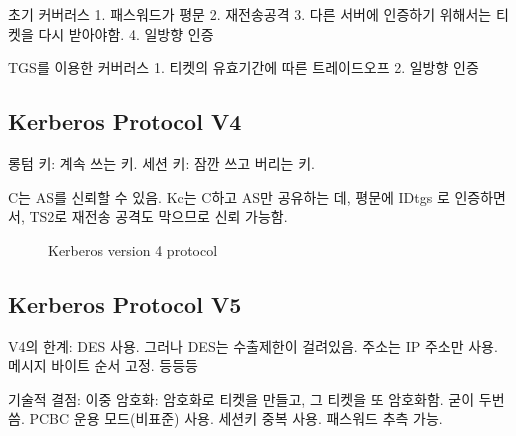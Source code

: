 초기 커버러스
1. 패스워드가 평문
2. 재전송공격
3. 다른 서버에 인증하기 위해서는 티켓을 다시 받아야함.
4. 일방향 인증

TGS를 이용한 커버러스
1. 티켓의 유효기간에 따른 트레이드오프
2. 일방향 인증

\subsection{Kerberos Protocol V4}

롱텀 키: 계속 쓰는 키.
세션 키: 잠깐 쓰고 버리는 키.

C는 AS를 신뢰할 수 있음. Kc는 C하고 AS만 공유하는 데, 평문에 IDtgs 로
인증하면서, TS2로 재전송 공격도 막으므로 신뢰 가능함.

\begin{figure}[H]
  \centering
  \caption{Kerberos version 4 protocol}
  \label{fig:ker_v4}
\end{figure}

\subsection{Kerberos Protocol V5}

V4의 한계:
DES 사용. 그러나 DES는 수출제한이 걸려있음.
주소는 IP 주소만 사용.
메시지 바이트 순서 고정.
등등등

기술적 결점:
이중 암호화: 암호화로 티켓을 만들고, 그 티켓을 또 암호화함. 굳이 두번씀.
PCBC 운용 모드(비표준) 사용.
세션키 중복 사용.
패스워드 추측 가능.

\begin{figure}[H]
  \centering
  \caption{}
  \label{fig:mac}
\end{figure}

